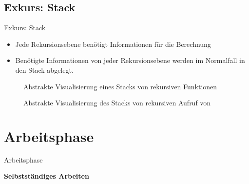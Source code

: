 \documentclass{../tuda-beamer}
\begin{document}
  \subsection{Exkurs: Stack}
  \begin{frame}{Exkurs: Stack}
    \begin{itemize}
      \item Jede Rekursionsebene benötigt Informationen für die Berechnung
      \item Benötigte Informationen von jeder Rekursionsebene werden im Normalfall in den
      Stack abgelegt.
    \end{itemize}
  \end{frame}

  \begin{frame}[c]
    \begin{figure}[h]
      \centering
      \caption{Abstrakte Visualisierung eines Stacks von rekursiven Funktionen}
    \end{figure}
  \end{frame}

  \begin{frame}[c]
    \begin{figure}[h]
      \centering
      \caption{Abstrakte Visualisierung des Stacks von rekursiven Aufruf von }
    \end{figure}
  \end{frame}


  \section{Arbeitsphase}
  \begin{frame}[c]{Arbeitsphase}
    \begin{center}
      \textbf{\LARGE Selbstständiges Arbeiten}
    \end{center}
  \end{frame}
\end{document}
